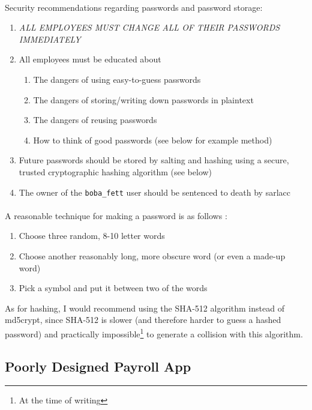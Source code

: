 \documentclass{article}
\begin{document}
\paragraph{}
\begin{adjustwidth}{1.5cm}{1.5cm}
	Security recommendations regarding passwords and password storage:
	\begin{enumerate}
		\item \emph{ALL EMPLOYEES MUST CHANGE ALL OF THEIR PASSWORDS IMMEDIATELY}
		\item All employees must be educated about
		\begin{enumerate}
			\item The dangers of using easy-to-guess passwords
			\item The dangers of storing/writing down passwords in plaintext
			\item The dangers of reusing passwords
			\item How to think of good passwords (see below for example method)
		\end{enumerate}
		\item Future passwords should be stored by salting and hashing using a secure, trusted cryptographic hashing algorithm (see below)
		\item The owner of the \texttt{boba\_fett} user should be sentenced to death by sarlacc
	\end{enumerate}
\end{adjustwidth}

\paragraph{}
A reasonable technique for making a password is as follows \parencite{computerphilechoosepassword}:
\begin{enumerate}
	\item Choose three random, 8-10 letter words
	\item Choose another reasonably long, more obscure word (or even a made-up word)
	\item Pick a symbol and put it between two of the words
\end{enumerate}
As for hashing, I would recommend using the SHA-512 algorithm instead of md5crypt, since SHA-512 is slower (and therefore harder to guess a hashed password) and practically impossible\footnote{At the time of writing} to generate a collision with this algorithm.

\subsection{Poorly Designed Payroll App}
\label{subsec:payroll_app}
\end{document}
